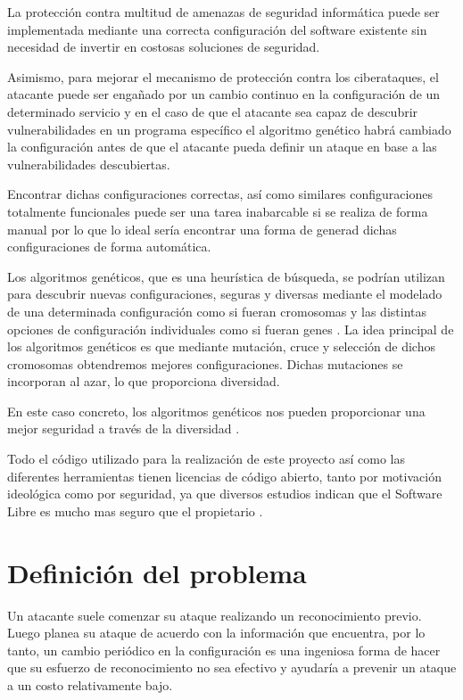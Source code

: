 \bigskip
La protección contra multitud de amenazas de seguridad informática puede ser implementada mediante una correcta configuración del software existente sin necesidad de invertir en costosas soluciones de seguridad.

\bigskip
Asimismo, para mejorar el mecanismo de protección contra los ciberataques, el atacante puede ser engañado por un cambio continuo en la configuración de un determinado servicio y en el caso de que el atacante sea capaz de descubrir vulnerabilidades en un programa específico el algoritmo genético habrá cambiado la configuración antes de que el atacante pueda definir un ataque en base a las vulnerabilidades descubiertas.

\bigskip
Encontrar dichas configuraciones correctas, así como similares configuraciones totalmente funcionales puede ser una tarea inabarcable si se realiza de forma manual por lo que lo ideal sería encontrar una forma de generad dichas configuraciones de forma automática.

\bigskip
Los algoritmos genéticos, que es una heurística de búsqueda, se podrían utilizan para descubrir nuevas configuraciones, seguras y diversas mediante el modelado de una determinada configuración como si fueran cromosomas y las distintas opciones de configuración individuales como si fueran genes \cite{john_evolutionary_2014}. La idea principal de los algoritmos genéticos es que mediante mutación, cruce y selección de dichos cromosomas obtendremos mejores configuraciones. Dichas mutaciones se incorporan al azar, lo que proporciona diversidad.

\bigskip
En este caso concreto, los algoritmos genéticos nos pueden proporcionar una mejor seguridad a través de la diversidad \cite{crouse_improving_2012}.

\bigskip
Todo el código utilizado para la realización de este proyecto así como las diferentes herramientas tienen licencias de código abierto, tanto por motivación ideológica como por seguridad, ya que diversos estudios indican que el Software Libre es mucho mas seguro que el propietario \cite{walia_comparative_2006} \cite{mansfield-devine_open_2008} \cite{clark_is_2009}.


\section{Definición del problema}

Un atacante suele comenzar su ataque realizando un reconocimiento previo. Luego planea su ataque de acuerdo con la información que encuentra, por lo tanto, un cambio periódico en la configuración es una ingeniosa forma de hacer que su esfuerzo de reconocimiento no sea efectivo y ayudaría a prevenir un ataque a un costo relativamente bajo.

